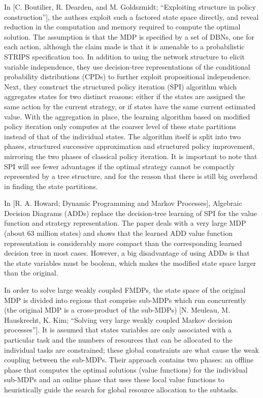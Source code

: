 \documentclass[11pt]{article}
\begin{document}
In [C. Boutilier, R. Dearden, and M. Goldszmidt; “Exploiting structure in policy construction”], the authors exploit such a factored state space directly, and reveal reduction in the computation and memory required to compute the optimal solution. The assumption is that the MDP is specified by a set of DBNs, one for each action, although the claim made is that it is amenable to a probabilistic STRIPS specification too. In addition to using the network structure to elicit variable independence, they use decision-tree representations of the conditional probability distributions (CPDs) to further exploit propositional independence. Next, they construct the structured policy iteration (SPI) algorithm which aggregates states for two distinct reasons: either if the states are assigned the same action by the current strategy, or if states have the same current estimated value. With the aggregation in place, the learning algorithm based on modified policy iteration only computes at the coarser level of these state partitions instead of that of the individual states. The algorithm itself is split into two phases, structured successive approximation and structured policy improvement, mirroring the two phases of classical policy iteration. It is important to note that SPI will see fewer advantages if the optimal strategy cannot be compactly represented by a tree structure, and for the reason that there is still big overhead in finding the state partitions.

In [R. A. Howard; Dynamic Programming and Markov Processes], Algebraic Decision Diagrams (ADDs) replace the decision-tree learning of SPI for the value function and strategy representation. The paper deals with a very large MDP (about 63 million states) and shows that the learned ADD value function representation is considerably more compact than the corresponding learned decision tree in most cases. However, a big disadvantage of using ADDs is that the state variables must be boolean, which makes the modified state space larger than the original.

In order to solve large weakly coupled FMDPs, the state space of the original MDP is divided into regions that comprise sub-MDPs which run concurrently (the original MDP is a cross-product of the sub-MDPs) [N. Meuleau, M. Hauskrecht, K. Kim; “Solving very large weakly coupled Markov decision processes”]. It is assumed that states variables are only associated with a particular task and the numbers of resources that can be allocated to the individual tasks are constrained; these global constraints are what cause the weak coupling between the sub-MDPs. Their approach contains two phases: an offline phase that computes the optimal solutions (value functions) for the individual sub-MDPs and an online phase that uses these local value functions to heuristically guide the search for global resource allocation to the subtasks.
\end{document}
